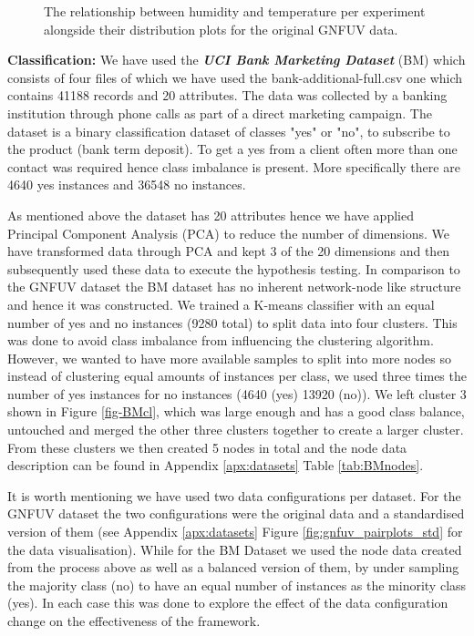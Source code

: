 \documentclass{mpaper}
\begin{document}
\begin{figure}
\begin{center}
\end{center}
\caption{\label{fig:gnfuv_pairplots} The relationship between humidity and temperature per experiment alongside their distribution plots for the original GNFUV data.}
\end{figure}


\textbf{Classification:} We have used the \textbf{\textit{UCI Bank Marketing Dataset}} (BM) \cite{BMDataset} which consists of four files of which we have used the bank-additional-full.csv one which contains 41188 records and 20 attributes. The data was collected by a banking institution through phone calls as part of a direct marketing campaign. The dataset is a binary classification dataset of classes "yes" or "no", to subscribe to the product (bank term deposit). To get a yes from a client often more than one contact was required hence class imbalance is present. More specifically there are 4640 yes instances and 36548 no instances. 

As mentioned above the dataset has 20 attributes hence we have applied Principal Component Analysis (PCA) to reduce the number of dimensions. We have transformed data through PCA and kept 3 of the 20 dimensions and then subsequently used these data to execute the hypothesis testing. In comparison to the GNFUV dataset the BM dataset has no inherent network-node like structure and hence it was constructed. We trained a K-means classifier with an equal number of yes and no instances (9280 total) to split data into four clusters. This was done to avoid class imbalance from influencing the clustering algorithm. However, we wanted to have more available samples to split into more nodes so instead of clustering equal amounts of instances per class, we used three times the number of yes instances for no instances (4640 (yes) 13920 (no)). We left cluster 3 shown in Figure \ref{fig-BMcl}, which was large enough and has a good class balance, untouched and merged the other three clusters together to create a larger cluster. From these clusters we then created 5 nodes in total and the node data description can be found in Appendix \ref{apx:datasets} Table \ref{tab:BMnodes}. 


It is worth mentioning we have used two data configurations per dataset. For the GNFUV dataset the two configurations were the original data and a standardised version of them (see Appendix \ref{apx:datasets} Figure \ref{fig:gnfuv_pairplots_std} for the data visualisation). While for the BM Dataset we used the node data created from the process above as well as a balanced version of them, by under sampling the majority class (no) to have an equal number of instances as the minority class (yes). In each case this was done to explore the effect of the data configuration change on the effectiveness of the framework.
\end{document}
